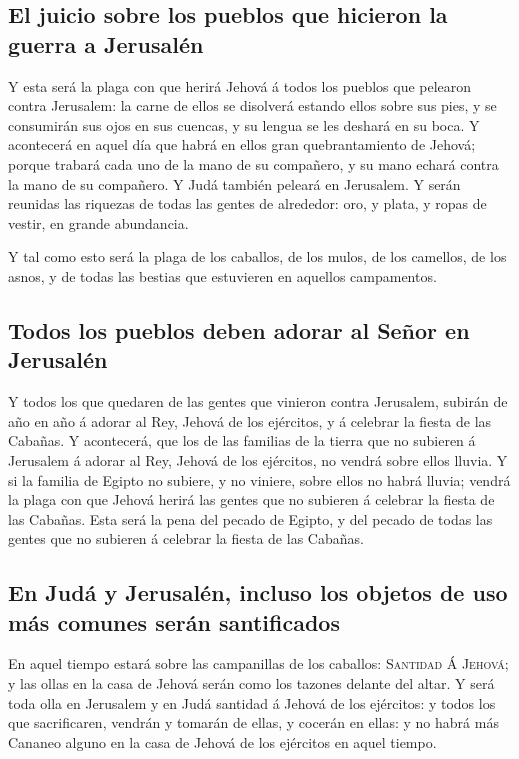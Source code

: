 \hypertarget{el-juicio-sobre-los-pueblos-que-hicieron-la-guerra-a-jerusaluxe9n}{%
\subsection{El juicio sobre los pueblos que hicieron la guerra a
Jerusalén}\label{el-juicio-sobre-los-pueblos-que-hicieron-la-guerra-a-jerusaluxe9n}}

 Y esta será la plaga con que herirá Jehová á todos los
pueblos que pelearon contra Jerusalem: la carne de ellos se disolverá
estando ellos sobre sus pies, y se consumirán sus ojos en sus cuencas, y
su lengua se les deshará en su boca.  Y acontecerá en
aquel día que habrá en ellos gran quebrantamiento de Jehová; porque
trabará cada uno de la mano de su compañero, y su mano echará contra la
mano de su compañero.  Y Judá también peleará en
Jerusalem. Y serán reunidas las riquezas de todas las gentes de
alrededor: oro, y plata, y ropas de vestir, en grande abundancia.

 Y tal como esto será la plaga de los caballos, de los
mulos, de los camellos, de los asnos, y de todas las bestias que
estuvieren en aquellos campamentos.

\hypertarget{todos-los-pueblos-deben-adorar-al-seuxf1or-en-jerusaluxe9n}{%
\subsection{Todos los pueblos deben adorar al Señor en
Jerusalén}\label{todos-los-pueblos-deben-adorar-al-seuxf1or-en-jerusaluxe9n}}

 Y todos los que quedaren de las gentes que vinieron
contra Jerusalem, subirán de año en año á adorar al Rey, Jehová de los
ejércitos, y á celebrar la fiesta de las Cabañas.  Y
acontecerá, que los de las familias de la tierra que no subieren á
Jerusalem á adorar al Rey, Jehová de los ejércitos, no vendrá sobre
ellos lluvia.  Y si la familia de Egipto no subiere, y no
viniere, sobre ellos no habrá lluvia; vendrá la plaga con que Jehová
herirá las gentes que no subieren á celebrar la fiesta de las Cabañas.
 Esta será la pena del pecado de Egipto, y del pecado de
todas las gentes que no subieren á celebrar la fiesta de las Cabañas.

\hypertarget{en-juduxe1-y-jerusaluxe9n-incluso-los-objetos-de-uso-muxe1s-comunes-seruxe1n-santificados}{%
\subsection{En Judá y Jerusalén, incluso los objetos de uso más comunes
serán
santificados}\label{en-juduxe1-y-jerusaluxe9n-incluso-los-objetos-de-uso-muxe1s-comunes-seruxe1n-santificados}}

 En aquel tiempo estará sobre las campanillas de los
caballos: \textsc{Santidad} Á \textsc{Jehová}; y las ollas en la casa de
Jehová serán como los tazones delante del altar.  Y será
toda olla en Jerusalem y en Judá santidad á Jehová de los ejércitos: y
todos los que sacrificaren, vendrán y tomarán de ellas, y cocerán en
ellas: y no habrá más Cananeo alguno en la casa de Jehová de los
ejércitos en aquel tiempo.
